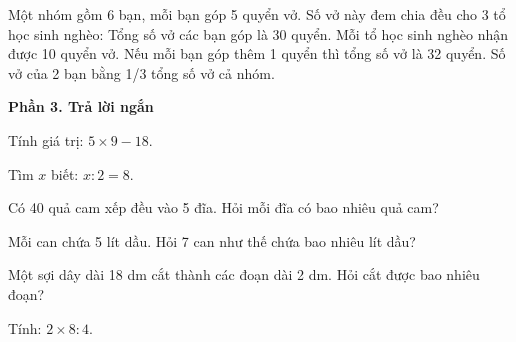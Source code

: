 \begin{ex} %
Một nhóm gồm 6 bạn, mỗi bạn góp 5 quyển vở. Số vở này đem chia đều cho 3 tổ học sinh nghèo:
\choiceTF
{\True Tổng số vở các bạn góp là 30 quyển.}
{\True Mỗi tổ học sinh nghèo nhận được 10 quyển vở.}
{Nếu mỗi bạn góp thêm 1 quyển thì tổng số vở là 32 quyển.}
{\True Số vở của 2 bạn bằng 1/3 tổng số vở cả nhóm.}
\end{ex}

\textbf{Phần 3. Trả lời ngắn}

\begin{ex} %
Tính giá trị: $5 \times 9 - 18$.
\end{ex}

\begin{ex} %
Tìm $x$ biết: $x : 2 = 8$.
\end{ex}

\begin{ex} %
Có 40 quả cam xếp đều vào 5 đĩa. Hỏi mỗi đĩa có bao nhiêu quả cam?
\end{ex}

\begin{ex} %
Mỗi can chứa 5 lít dầu. Hỏi 7 can như thế chứa bao nhiêu lít dầu?
\end{ex}

\begin{ex} %
Một sợi dây dài 18 dm cắt thành các đoạn dài 2 dm. Hỏi cắt được bao nhiêu đoạn?
\end{ex}

\begin{ex} %
Tính: $2 \times 8 : 4$.
\end{ex}

